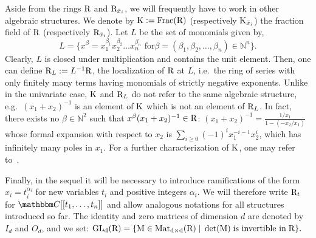 \documentclass[final,1p,times,number,amsthm]{elsart}
\let\set\mathbbm
\begin{document}
Aside from the rings $\rm R$ and ${\rm R}_{\bar{x}_i}$, we will frequently have
to work in other algebraic structures. We denote by
${\rm K}:=\operatorname{Frac}({\rm R})$ (respectively ${\rm K}_{\bar{x}_i}$) the
fraction field of $\rm R$ (respectively ${\rm R}_{\bar{x}_i}$).  Let $L$ be the set of
monomials given by,
$$ L = \{ x^{\beta} = x_1^{\beta_1} x_2^{\beta_2} \dots x_n^{\beta_n}\text{ for
} \beta = (\beta_1, \beta_2, \dots, \beta_n) \in \mathbb{N}^n \}. $$
Clearly, $L$ is closed under multiplication and contains the unit element. Then,
one can define ${\rm R}_{L} := L^{-1} \rm R$, the localization of $\rm R$ at
$L$, i.e.\ the ring of series with only finitely many terms having monomials of
strictly negative exponents. Unlike in the univariate case, $\rm K$ and
${\rm R}_L$ do not refer to the same algebraic structure, e.g.\ $(x_1+x_2)^{-1}$
is an element of $\rm K$ which is not an element of ${\rm R}_L$. In fact, there
exists no $\beta \in \mathbb{N}^2$ such that
$x^{\beta} (x_1+x_2)^{-1} \in \rm R$:
$(x_1+x_2)^{-1} = \frac{1/x_1}{1-(-x_2/x_1)} $ whose formal expansion with
respect to $x_2$ is $\sum_{i\geq 0}(-1)^ix_1^{-i-1}x_2^i$, which has infinitely
many poles in $x_1$. For a further characterization of $\rm K$, one may refer
to~\cite{key3908}.


Finally, in the sequel it will be necessary to introduce ramifications of the
form $x_i=t_i^{\alpha_i}$ for new variables $t_i$ and positive integers
$\alpha_i$. We will therefore write ${\rm R}_t$ for $\set C[[t_1,\dots,t_n]]$
and allow analogous notations for all structures introduced so far. The identity
and zero matrices of dimension $d$ are denoted by $I_d$ and $O_d$, and we set: $\rm{GL}_d (R) = \{ M \in\operatorname{Mat}_{d\times d}({\rm R})\; | \; \operatorname{det} (M) \; \text{is invertible in} \; \rm R \}.$
 
\end{document}

